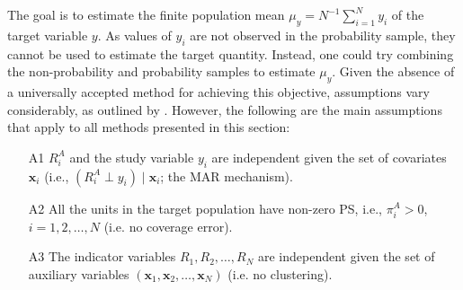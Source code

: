 \documentclass[
]{jss}
\begin{document}
\begin{table}[ht!]
    \centering
    \caption{Two-sample setting}
    \label{tab-two-sources}
\end{table}

The goal is to estimate the finite population mean
\(\mu_y=N^{-1}\sum_{i=1}^{N} y_{i}\) of the target variable \(y\). As
values of \(y_{i}\) are not observed in the probability sample, they
cannot be used to estimate the target quantity. Instead, one could try
combining the non-probability and probability samples to estimate
\(\mu_y\). Given the absence of a universally accepted method for
achieving this objective, assumptions vary considerably, as outlined by
\cite{wu2022statistical}. However, the following are the main
assumptions that apply to all methods presented in this section:

\begin{itemize}
\item[A1] $R_i^A$ and the study variable $y_i$ are independent given the set of covariates $\boldsymbol{x}_i$ (i.e., $\left(R_i^A \perp y_i\right) \mid \boldsymbol{x}_i$; the MAR mechanism).
\item[A2] All the units in the target population have non-zero PS, i.e., $\pi_i^A>0$, $i=1,2, \ldots, N$ (i.e. no coverage error).
\item[A3] The indicator variables $R_1, R_2, \ldots, R_N$ are independent given the set of auxiliary variables $\left(\boldsymbol{x}_1, \boldsymbol{x}_2, \ldots, \boldsymbol{x}_N\right)$ (i.e. no clustering).
\end{itemize}
\end{document}
